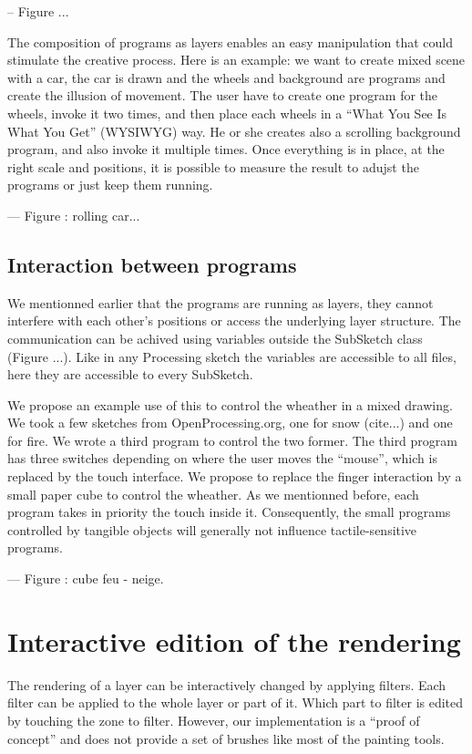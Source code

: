 \documentclass{sigchi}
\begin{document}
-- Figure ... 


The composition of programs as layers enables an easy manipulation
that could stimulate the creative process. Here is an example: we want
to create mixed scene with a car, the car is drawn and the wheels and
background are programs and create the illusion of movement. 
The user have to create one program for the wheels, invoke it two
times, and then place each wheels in a ``What You See Is What You
Get'' (WYSIWYG) way. He or she creates also a scrolling background
program, and also invoke it multiple times. Once everything is in
place, at the right scale and positions, it is possible to measure the
result to adujst the programs or just keep them running. 

--- Figure : rolling car... 

\subsection{Interaction between programs}

We mentionned earlier that the programs are running as layers, they
cannot interfere with each other's positions or access the underlying
layer structure. The communication can be achived using variables
outside the SubSketch class (Figure ...). Like in any Processing
sketch the variables are accessible to all files, here they are
accessible to every SubSketch. 

We propose an example use of this to control the wheather in a mixed
drawing. We took a few sketches from OpenProcessing.org, one for
snow (cite...) and one for fire. We wrote a third program to control
the two former. The third program has three switches depending on
where the user moves the ``mouse'', which is replaced by the touch
interface. We propose to replace the finger interaction by a small
paper cube to control the wheather. As we mentionned before, each
program takes in priority the touch inside it. Consequently, 
the small programs controlled by tangible objects will generally not
influence tactile-sensitive programs. 

--- Figure : cube feu - neige.

\section{Interactive edition of the rendering}

The rendering of a layer can be interactively changed by applying
filters. Each filter can be applied to the whole layer or part of
it. Which part to filter is edited by touching the zone to
filter. However, our implementation is a ``proof of concept'' and does
not provide a set of brushes like most of the painting tools.
\end{document}
